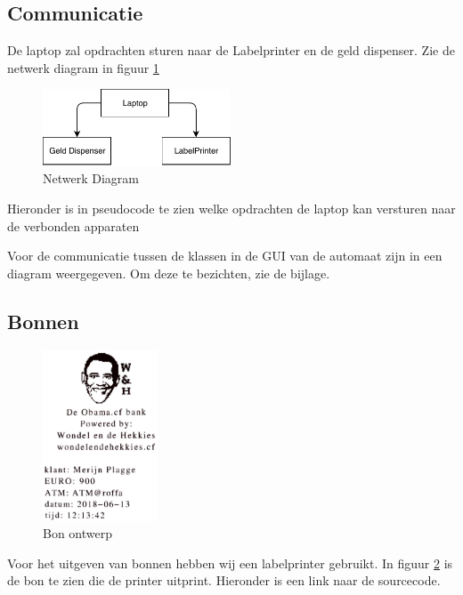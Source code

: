 \documentclass{article}
\begin{document}
\subsection{Communicatie}

De laptop zal opdrachten sturen naar de Labelprinter en de geld dispenser.
Zie de netwerk diagram in figuur \ref{fig: Netwerk Diagram}

\begin{figure}[H]
        \centering
        \includegraphics[height=0.9in]{netwerk_diagram.pdf}
        \caption{Netwerk Diagram}
        \label{fig: Netwerk Diagram}
\end{figure}

Hieronder is in pseudocode te zien welke opdrachten de laptop kan versturen naar de verbonden apparaten 


Voor de communicatie tussen de klassen in de GUI van de automaat zijn in een diagram weergegeven.
Om deze te bezichten, zie de bijlage.

\newpage
\subsection{Bonnen}

\begin{figure}[H]
        \centering
        \includegraphics[height=2.0in]{obama_bon.pdf}
       \caption{Bon ontwerp}
       \label{fig: Bon ontwerp}
\end{figure}

Voor het uitgeven van bonnen hebben wij een labelprinter gebruikt.
In figuur \ref{fig: Bon ontwerp} is de bon te zien die de printer uitprint.
Hieronder is een link naar de sourcecode.

\vspace{1mm}\
\end{document}
